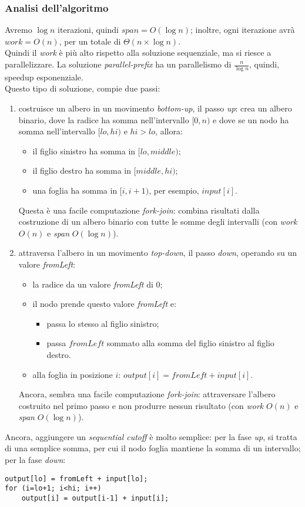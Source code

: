 \subsubsection{Analisi dell'algoritmo}
Avremo $\log{n}$ iterazioni, quindi $span = O(\log{n})$; inoltre, ogni iterazione avrà $work = O(n)$, per un totale di $\Theta(n\times \log{n})$. \\
Quindi il \textit{work} è più alto rispetto alla soluzione sequenziale, ma si riesce a parallelizzare. La soluzione \textit{parallel-prefix} ha un parallelismo di $\frac{n}{\log{n}}$, quindi, speedup esponenziale. \\
Questo tipo di soluzione, compie due passi:
\begin{enumerate}
	\item costruisce un albero in un movimento \textit{bottom-up}, il passo \textit{up}: crea un albero binario, dove la radice ha somma nell'intervallo $[0,n)$ e dove se un nodo ha somma nell'intervallo $[lo, hi)$ e $hi>lo$, allora:
	\begin{itemize}
		\item il figlio sinistro ha somma in $[lo, middle)$;
		\item il figlio destro ha somma in $[middle, hi)$;
		\item una foglia ha somma in $[i, i+1)$, per esempio, $input[i]$.
	\end{itemize}
	Questa è una facile computazione \textit{fork-join}: combina risultati dalla costruzione di un albero binario con tutte le somme degli intervalli (con \textit{work} $O(n)$ e \textit{span} $O(\log{n})$).
	\item attraversa l'albero in un movimento \textit{top-down}, il passo \textit{down}, operando su un valore \textit{fromLeft}:
	\begin{itemize}
		\item la radice da un valore \textit{fromLeft} di $0$;
		\item il nodo prende questo valore \textit{fromLeft} e:
		\begin{itemize}
			\item passa lo stesso al figlio sinistro;
			\item passa $fromLeft$ sommato alla somma del figlio sinistro al figlio destro.
		\end{itemize}
		\item alla foglia in posizione $i$: $output[i] = fromLeft + input[i]$.
	\end{itemize}
	Ancora, sembra una facile computazione \textit{fork-join}: attraversare l'albero costruito nel primo passo e non produrre nessun risultato (con \textit{work} $O(n)$ e \textit{span} $O(\log{n})$).
\end{enumerate}
Ancora, aggiungere un \textit{sequential cutoff} è molto semplice: per la fase \textit{up}, si tratta di una semplice somma, per cui il nodo foglia mantiene la somma di un intervallo; per la fase \textit{down}:
\begin{lstlisting}
output[lo] = fromLeft + input[lo];
for (i=lo+1; i<hi; i++)
	output[i] = output[i-1] + input[i];
\end{lstlisting}

